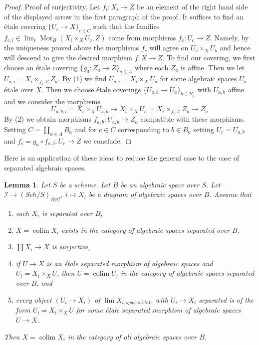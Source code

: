 \documentclass{stacks-project}
\theoremstyle{plain}
\newtheorem{lemma}[subsection]{Lemma}
\theoremstyle{definition}
\theoremstyle{remark}
\numberwithin{equation}{subsection}
\def\lim{\mathop{\mathrm{lim}}\nolimits}
\def\colim{\mathop{\mathrm{colim}}\nolimits}
\def\Sch{\mathit{Sch}}
\def\Mor{\mathop{\mathrm{Mor}}\nolimits}
\def\etale{{\acute{e}tale}}
\begin{document}
\begin{proof}
\medskip\noindent
Proof of surjectivity. Let $f_i : X_i \to Z$ be an element of the
right hand side of the displayed arrow in the first paragraph of the proof.
It suffices to find an \'etale covering $\{U_c \to X\}_{c \in C}$
such that the families $f_{c, i} \in \lim_i \Mor_B(X_i \times_X U_c, Z)$
come from morphisms $f_c : U_c \to Z$. Namely, by the uniqueness
proved above the morphisms $f_c$ will agree on $U_c \times_X U_b$
and hence will descend to give the desired morphism $f : X \to Z$.
To find our covering, we first choose an \'etale covering
$\{g_a : Z_a \to Z\}_{a \in A}$ where each $Z_a$ is affine. Then we let
$U_{a, i} = X_i \times_{f_i, Z} Z_a$. By (1) we find
$U_{a, i} = X_i \times_X U_a$ for some algebraic spaces $U_a$ \'etale
over $X$. Then we choose \'etale coverings
$\{U_{a, b} \to U_a\}_{b \in B_a}$
with $U_{a, b}$ affine and we consider the morphisms
$$
U_{a, b, i} = X_i \times_X U_{a, b} \to
X_i \times_X U_a = X_i \times_{f_i, Z} Z_a \to Z_a
$$
By (2) we obtain morphisms $f_{a, b} : U_{a, b} \to Z_a$ compatible with these
morphisms. Setting $C = \coprod_{a \in A} B_a$ and for $c \in C$
corresponding to $b \in B_a$ setting $U_c = U_{a, b}$ and
$f_c = g_a \circ f_{a, b} : U_c \to Z$ we conclude.
\end{proof}

\noindent
Here is an application of these ideas to reduce the general case
to the case of separated algebraic spaces.

\begin{lemma}
\label{lemma-colimit-separated-enough}
Let $S$ be a scheme. Let $B$ be an algebraic space over $S$.
Let $\mathcal{I} \to (\Sch/S)_{fppf}$, $i \mapsto X_i$
be a diagram of algebraic spaces over $B$. Assume that
\begin{enumerate}
\item each $X_i$ is separated over $B$,
\item $X = \colim X_i$ exists in the category of
algebraic spaces separated over $B$,
\item $\coprod X_i \to X$ is surjective,
\item if $U \to X$ is an \'etale separated morphism of algebraic spaces and
$U_i = X_i \times_X U$, then $U = \colim U_i$ in
the category of algebraic spaces separated over $B$, and
\item every object $(U_i \to X_i)$ of $\lim X_{i, spaces, \etale}$
with $U_i \to X_i$ separated is of the form $U_i = X_i \times_X U$
for some \'etale separated morphism of algebraic spaces $U \to X$.
\end{enumerate}
Then $X = \colim X_i$ in the category of all algebraic spaces over $B$.
\end{lemma}
\end{document}
